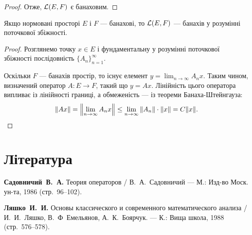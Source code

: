 \begin{proof}
Отже, $\mathcal{L}(E, F)$ є банаховим. 
\end{proof}

\begin{theorem}
Якщо нормовані просторі $E$ і $F$ --- банахові,
то $\mathcal{L}(E, F)$ --- банахів у розумінні поточкової збіжності.
\end{theorem}

\begin{proof}
Розглянемо точку $x \in E$ і фундаментальну у
розумінні поточкової збіжності послідовність $\{A_n\}_{n = 1}^\infty$.

Оскільки $F$ --- банахів простір, то існує елемент $y = \lim_{n \to \infty} A_n x$.
Таким чином, визначений оператор
$A: E \to F$, такий що $y = Ax$. Лінійність цього оператора
випливає із лінійності границі, а обмеженість --- із теореми
Банаха-Штейнгауза:
\begin{equation*}
    \|A x\| =
    \left\| \lim_{n \to \infty} A_n x\right\| \le
    \lim_{n \to \infty} \|A_n\| \cdot \|x\| =
    C \|x\|. \qedhere
\end{equation*}
\end{proof}

\section{Література}

\begin{enumerate}[label={[\arabic*]}]
\item \textbf{Садовничий~В.~А.}
Теория операторов /
В.~А.~Садовничий ---
М.: Изд-во Моск. ун-та, 1986 (стр.~96--102).
\item \textbf{Ляшко~И.~И.}
Основы классического и современного математического анализа /
И.~И.~Ляшко, В.~Ф~Емельянов, А.~К.~Боярчук. ---
К.: Вища школа, 1988 (стр.~576--578).
\end{enumerate}
